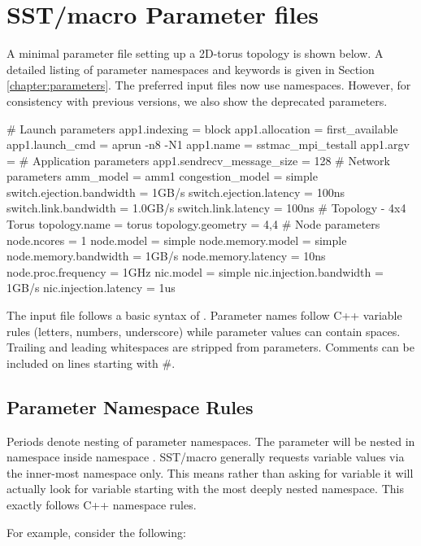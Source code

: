 
\section{SST/macro Parameter files}
\label{sec:parameters}
A minimal parameter file setting up a 2D-torus topology is shown below. 
A detailed listing of parameter namespaces and keywords is given in Section \ref{chapter:parameters}.
The preferred input files now use namespaces.
However, for consistency with previous versions, we also show the deprecated parameters.

\begin{ViFile}
# Launch parameters
app1.indexing = block
app1.allocation = first_available
app1.launch_cmd = aprun -n8 -N1
app1.name = sstmac_mpi_testall
app1.argv =
# Application parameters
app1.sendrecv_message_size = 128
# Network parameters
amm_model = amm1
congestion_model = simple
switch.ejection.bandwidth = 1GB/s
switch.ejection.latency = 100ns
switch.link.bandwidth = 1.0GB/s
switch.link.latency = 100ns
# Topology - 4x4 Torus
topology.name = torus
topology.geometry = 4,4
# Node parameters
node.ncores = 1
node.model = simple
node.memory.model = simple
node.memory.bandwidth = 1GB/s
node.memory.latency = 10ns
node.proc.frequency = 1GHz
nic.model = simple
nic.injection.bandwidth = 1GB/s
nic.injection.latency = 1us
\end{ViFile}
The input file follows a basic syntax of .  
Parameter names follow C++ variable rules (letters, numbers, underscore) while parameter values can contain spaces.  Trailing and leading whitespaces are stripped from parameters.
Comments can be included on lines starting with \#.

\subsection{Parameter Namespace Rules}
\label{subsec:parameterNamespace}
Periods denote nesting of parameter namespaces.
The parameter  will be nested in namespace  inside namespace .
SST/macro generally requests variable values via the inner-most namespace only.
This means rather than asking for variable  it will actually look for variable  starting with the most deeply nested namespace.
This exactly follows C++ namespace rules.

For example, consider the following:

